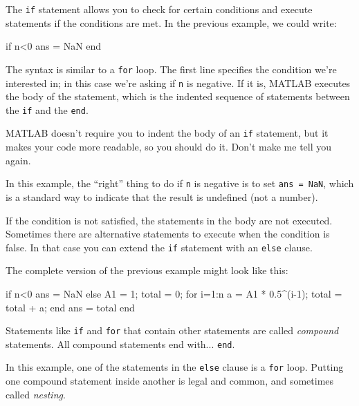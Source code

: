 
The {\tt if} statement allows you to check for certain conditions
and execute statements if the conditions are met.  In the previous
example, we could write:

\begin{code}
if n<0
    ans = NaN
end
\end{code}

The syntax is similar to a {\tt for} loop.  The first line
specifies the condition we're interested in; in this case we're asking if {\tt n} is negative.  If it is, MATLAB executes
the body of the statement, which is the indented sequence of
statements between the {\tt if} and the {\tt end}.


MATLAB doesn't require you to indent the body of an {\tt if}
statement, but it makes your code more readable, so you should do it.
Don't make me tell you again.

In this example, the ``right'' thing to do if {\tt n} is negative
is to set {\tt ans = NaN}, which is a standard way to indicate that
the result is undefined (not a number).


If the condition is not satisfied, the statements in the body are
not executed.  Sometimes there are alternative statements to
execute when the condition is false.  In that case you can extend
the {\tt if} statement with an {\tt else} clause.


The complete version of the previous example might look like this:

\begin{code}
if n<0
    ans = NaN
else
    A1 = 1;
    total = 0;
    for i=1:n
        a = A1 * 0.5^(i-1);
        total = total + a;
    end
    ans = total
end
\end{code}

Statements like {\tt if} and {\tt for} that contain other statements
are called \emph{compound} statements.  All compound statements end
with... {\tt end}.


In this example, one of the statements in the {\tt else} clause is a
{\tt for} loop.  Putting one compound statement inside another is
legal and common, and sometimes called \emph{nesting}.

